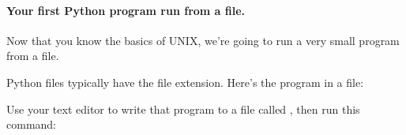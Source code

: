 \paragraph{Your first Python program run from a file.}

Now that you know the basics of UNIX, we're going to run a very small
program from a file.

Python files typically have the  file extension. Here's the
 program in a file:


Use your text editor to write that program to a file called
, then run this command:

